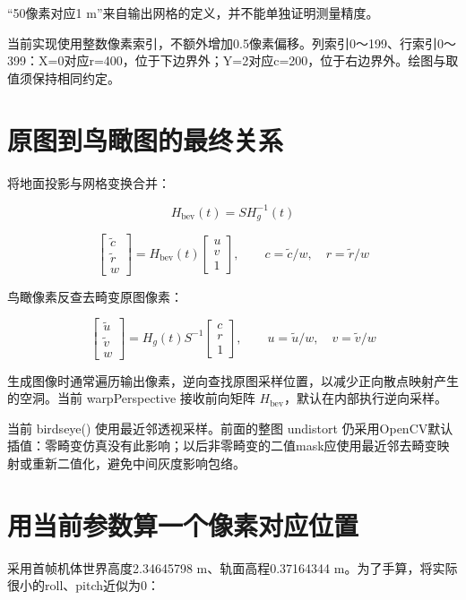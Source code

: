 \documentclass[UTF8,a4paper,11pt,fontset=windows]{ctexart}
\begin{document}
“50像素对应1 m”来自输出网格的定义，并不能单独证明测量精度。


当前实现使用整数像素索引，不额外增加0.5像素偏移。列索引0～199、行索引0～399：X=0对应r=400，位于下边界外；Y=2对应c=200，位于右边界外。绘图与取值须保持相同约定。


\section{原图到鸟瞰图的最终关系}

将地面投影与网格变换合并：


\[
\boxed{H_{\mathrm{bev}}(t)=S H_g^{-1}(t)}
\]

\[
\begin{bmatrix}\tilde c\\\tilde r\\w\end{bmatrix}
=
H_{\mathrm{bev}}(t)\begin{bmatrix}u\\v\\1\end{bmatrix},
\qquad
\boxed{c=\tilde c/w,\quad r=\tilde r/w}
\]

鸟瞰像素反查去畸变原图像素：


\[
\begin{bmatrix}\tilde u\\\tilde v\\w\end{bmatrix}
=
H_g(t)S^{-1}\begin{bmatrix}c\\r\\1\end{bmatrix},
\qquad u=\tilde u/w,\quad v=\tilde v/w
\]

生成图像时通常遍历输出像素，逆向查找原图采样位置，以减少正向散点映射产生的空洞。当前 warpPerspective 接收前向矩阵 \(H_{\mathrm{bev}}\)，默认在内部执行逆向采样。


当前 birdseye() 使用最近邻透视采样。前面的整图 undistort 仍采用OpenCV默认插值：零畸变仿真没有此影响；以后非零畸变的二值mask应使用最近邻去畸变映射或重新二值化，避免中间灰度影响包络。


\section{用当前参数算一个像素对应位置}

采用首帧机体世界高度2.34645798 m、轨面高程0.37164344 m。为了手算，将实际很小的roll、pitch近似为0：
\end{document}
